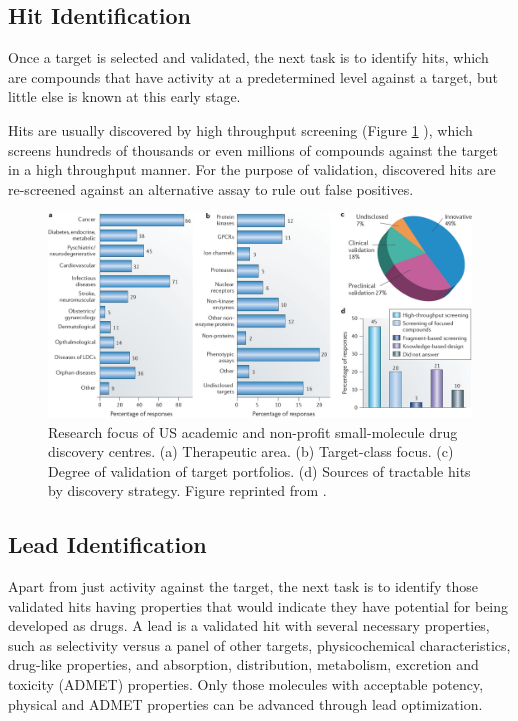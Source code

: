 \subsection{Hit Identification}

Once a target is selected and validated, the next task is to identify hits, which are compounds that have activity at a predetermined level against a target, but little else is known at this early stage.

Hits are usually discovered by high throughput screening \citep{641-2011,504-2010,736-2011} (Figure \ref{fig:USAcademicDrugDiscoveryResearchFocus} \citep{721-2011}), which screens hundreds of thousands or even millions of compounds against the target in a high throughput manner. For the purpose of validation, discovered hits are re-screened against an alternative assay to rule out false positives.

\begin{figure}
\centering
\includegraphics[width=\textwidth]{Background/Figures/USAcademicDrugDiscoveryResearchFocus.png}
\caption{Research focus of US academic and non-profit small-molecule drug discovery centres. (a) Therapeutic area. (b) Target-class focus. (c) Degree of validation of target portfolios. (d) Sources of tractable hits by discovery strategy. Figure reprinted from \citep{721-2011}.}
\label{fig:USAcademicDrugDiscoveryResearchFocus}
\end{figure}

\subsection{Lead Identification}

Apart from just activity against the target, the next task is to identify those validated hits having properties that would indicate they have potential for being developed as drugs. A lead is a validated hit with several necessary properties, such as selectivity versus a panel of other targets, physicochemical characteristics, drug-like properties, and absorption, distribution, metabolism, excretion and toxicity (ADMET) properties. Only those molecules with acceptable potency, physical and ADMET properties can be advanced through lead optimization.

